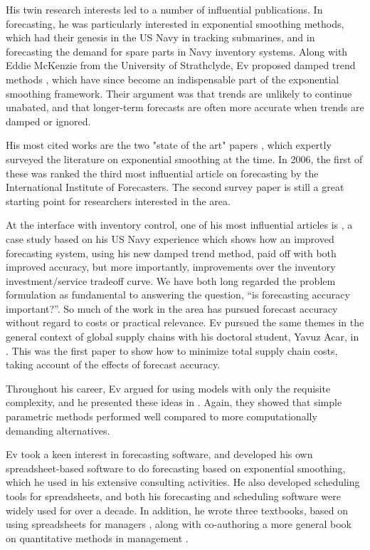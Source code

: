 \documentclass[11pt, a4paper]{article}
\begin{document}
His twin research interests led to a number of influential publications. In forecasting, he was particularly interested in exponential smoothing methods, which had their genesis in the US Navy in tracking submarines, and in forecasting the demand for spare parts in Navy inventory systems. Along with Eddie McKenzie from the University of Strathclyde, Ev proposed damped trend methods \citep{Gardner1985-lk,Gardner1989-bi}, which have since become an indispensable part of the exponential smoothing framework. Their argument was that trends are unlikely to continue unabated, and that longer-term forecasts are often more accurate when trends are damped or ignored.

His most cited works are the two "state of the art" papers \citep{Gardner1985-yu,Gardner2006-qq}, which expertly surveyed the literature on exponential smoothing at the time. In 2006, the first of these was ranked the third most influential article on forecasting by the International Institute of Forecasters. The second survey paper is still a great starting point for researchers interested in the area.

At the interface with inventory control, one of his most influential articles is \citet{Gardner1990-pw}, a case study based on his US Navy experience which shows how an  improved forecasting system, using his new damped trend method, paid off with both improved accuracy, but more importantly, improvements over the inventory investment/service tradeoff curve. We have both long regarded the problem formulation as fundamental to answering the question, ``is forecasting accuracy important?''. So much of the work in the area has pursued forecast accuracy without regard to costs or practical relevance. Ev pursued the same themes in the general context of global supply chains with his doctoral student, Yavuz Acar, in \citet{Acar2012ForecastingMS}. This was the first paper to show how to minimize total supply chain costs, taking account of the effects of forecast accuracy.

Throughout his career, Ev argued for using models with only the requisite complexity, and he presented these ideas in \citet{Syntetos2015ForecastingII}. Again, they showed that simple parametric methods performed well compared to more computationally demanding alternatives.

Ev took a keen interest in forecasting software, and developed his own spreadsheet-based software to do forecasting based on exponential smoothing, which he used in his extensive consulting activities. He also developed scheduling tools for spreadsheets, and both his forecasting and scheduling software were widely used for over a decade. In addition, he wrote three textbooks, based on using spreadsheets for managers \citep{book92,book93,book94}, along with co-authoring a more general book on quantitative methods in management \citep{book95}.
\end{document}
